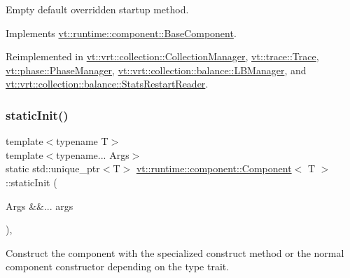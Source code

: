 Empty default overridden startup method. 



Implements \hyperlink{structvt_1_1runtime_1_1component_1_1_base_component_a8bf92f9f0a7027abf7deaefa2e7f5202}{vt\+::runtime\+::component\+::\+Base\+Component}.



Reimplemented in \hyperlink{structvt_1_1vrt_1_1collection_1_1_collection_manager_ac71095016a20dd9607f2f937bf35305e}{vt\+::vrt\+::collection\+::\+Collection\+Manager}, \hyperlink{structvt_1_1trace_1_1_trace_a5dd8767d9020ebeaba49ea3a684738a1}{vt\+::trace\+::\+Trace}, \hyperlink{structvt_1_1phase_1_1_phase_manager_a541d1f6c7a350fad979911ac60f38025}{vt\+::phase\+::\+Phase\+Manager}, \hyperlink{structvt_1_1vrt_1_1collection_1_1balance_1_1_l_b_manager_add5427abf4c6e21e39f581635997ddac}{vt\+::vrt\+::collection\+::balance\+::\+L\+B\+Manager}, and \hyperlink{structvt_1_1vrt_1_1collection_1_1balance_1_1_stats_restart_reader_a0a2bd4e4f989766216237d6aedfaaa51}{vt\+::vrt\+::collection\+::balance\+::\+Stats\+Restart\+Reader}.

\mbox{\label{structvt_1_1runtime_1_1component_1_1_component_ac969a635e579cf7be3af696f500bf260}} 
\subsubsection{\texorpdfstring{static\+Init()}{staticInit()}}
{\footnotesize\ttfamily template$<$typename T$>$ \\
template$<$typename... Args$>$ \\
static std\+::unique\+\_\+ptr$<$T$>$ \hyperlink{structvt_1_1runtime_1_1component_1_1_component}{vt\+::runtime\+::component\+::\+Component}$<$ T $>$\+::static\+Init (\begin{DoxyParamCaption}\item[{Args \&\&...}]{args }\end{DoxyParamCaption})\hspace{0.3cm}{\ttfamily [inline]}, {\ttfamily [static]}}



Construct the component with the specialized construct method or the normal component constructor depending on the type trait. 


